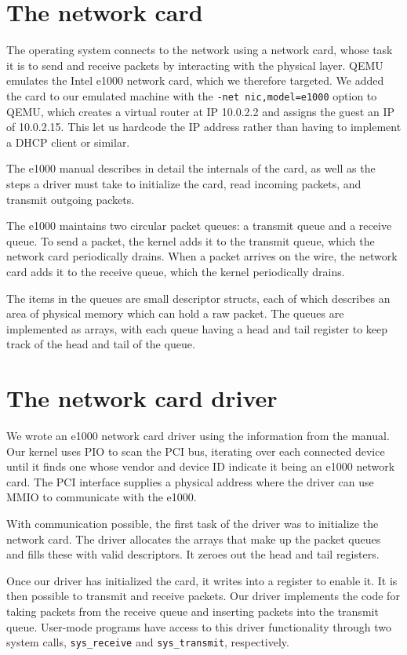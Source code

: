 \documentclass{report}
\begin{document}
\section{The network card}
The operating system connects to the network using a network card, whose task it
is to send and receive packets by interacting with the physical layer. QEMU
emulates the Intel e1000 network card, which we therefore targeted. We added
the card to our emulated machine with the \texttt{-net nic,model=e1000} option to
QEMU, which creates a virtual router at IP 10.0.2.2 and assigns the guest an
IP of 10.0.2.15. This let us hardcode the IP address rather than having to
implement a DHCP client or similar.

The e1000 manual \cite{e1000manual} describes in detail the internals of the
card, as well as the steps a driver must take to initialize the card, read
incoming packets, and transmit outgoing packets. 

The e1000 maintains two circular packet queues: a transmit queue and a receive
queue. To send a packet, the kernel adds it to the transmit queue, which the
network card periodically drains. When a packet arrives on the wire, the
network card adds it to the receive queue, which the kernel periodically
drains.

The items in the queues are small descriptor structs, each of which describes
an area of physical memory which can hold a raw packet. The queues are
implemented as arrays, with each queue having a head and tail register to keep
track of the head and tail of the queue.



\section{The network card driver}
We wrote an e1000 network card driver using the information from the manual.
Our kernel uses PIO to scan the PCI bus, iterating over each connected
device until it finds one whose vendor and device ID indicate it being an
e1000 network card. The PCI interface supplies a physical address where the
driver can use MMIO to communicate with the e1000.

With communication possible, the first task of the driver was to initialize
the network card. The driver allocates the arrays that make up the packet
queues and fills these with valid descriptors. It zeroes out the head and tail
registers.

Once our driver has initialized the card, it writes into a register to enable
it. It is then possible to transmit and receive packets. Our driver implements
the code for taking packets from the receive queue and inserting packets into
the transmit queue. User-mode programs have access to this driver
functionality through two system calls, \texttt{sys\_receive} and
\texttt{sys\_transmit}, respectively.
\end{document}
